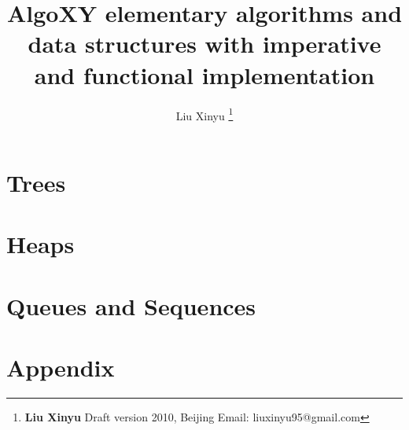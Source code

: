 \documentclass[a4paper,twoside]{book} %
\begin{document}


\title{{\bf \Huge AlgoXY} elementary algorithms and data structures \newline
            with imperative and functional implementation \newline
            \newline
            }

\author{Liu Xinyu
  \thanks{{\bfseries Liu Xinyu } \newline
    Draft version 2010, Beijing \newline
    Email: liuxinyu95@gmail.com \newline
    }}

\maketitle


\tableofcontents
\newpage



\part{Trees}














\part{Heaps}




\part{Queues and Sequences}


\part{Appendix}


\printindex
\end{document}
